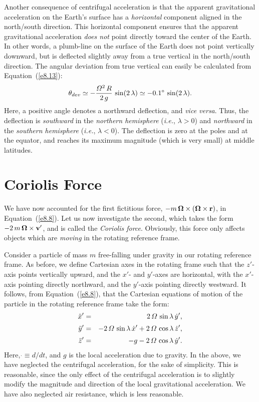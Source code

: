 Another consequence of centrifugal acceleration is that the apparent
gravitational acceleration on the Earth's surface has a {\em horizontal}\/
component aligned in the north/south direction. This horizontal component
ensures that the apparent gravitational acceleration {\em does not}\/ point
directly toward the center of the Earth. In other words,
a plumb-line on the surface of the Earth does not point vertically
downward, but is deflected slightly away from a true vertical in the north/south
direction. The angular deviation from true vertical can easily be 
calculated from Equation~(\ref{e8.13}):
\begin{equation}
\theta_{dev} \simeq - \frac{{\mit\Omega}^2\,R}{2\,g}\,\sin(2\,\lambda)\simeq 
-0.1^\circ\,\sin(2\,\lambda).
\end{equation}
Here, a positive angle denotes a northward deflection, and {\em vice versa}.
Thus, the deflection is {\em southward}\/ in the {\em northern hemisphere}\/ ({\em i.e.},
$\lambda>0$) and {\em northward}\/ in the {\em  southern hemisphere}\/ ({\em i.e.}, 
$\lambda < 0$). The deflection is
zero at the poles and at the equator, and reaches its maximum magnitude
(which is very small) at middle latitudes.

\section{Coriolis Force}
We have now accounted for the first fictitious force,
$-m\,\mbox{\boldmath$\Omega$}\times(\mbox{\boldmath$\Omega$}\times{\bf r})$, in Equation~(\ref{e8.8}).
Let us now investigate the second, which takes the form $-2\,m\,\mbox{\boldmath$\Omega$}\times{\bf v}'$, and is called the {\em Coriolis force}.
Obviously, this force only affects objects which are {\em moving}\/ in the rotating
reference frame.

Consider a particle of mass $m$ free-falling under gravity in our rotating reference frame. As before, we define  Cartesian axes in the rotating  frame such that the $z'$-axis
points vertically upward, and the $x'$- and $y'$-axes are horizontal, with
the $x'$-axis pointing directly northward, and the $y'$-axis pointing directly
westward. It follows, from Equation~(\ref{e8.8}), that the Cartesian equations of motion of the particle
in the rotating reference frame take the form:
\begin{eqnarray}\label{e8.18}
\ddot{x}' &=&2\,{\mit\Omega}\,\sin\lambda\,\dot{y}',\\[0.5ex]
\ddot{y}'&=&-2\,{\mit\Omega}\,\sin\lambda\,\dot{x}'+2\,{\mit\Omega}\,\cos\lambda\,
\dot{z}',\label{e8.19}\\[0.5ex]
\ddot{z}'&=& -g - 2\,{\mit\Omega}\,\cos\lambda\,\dot{y}'.\label{e8.20}
\end{eqnarray}
Here, $\dot{}\equiv d/dt$, and $g$ is the local acceleration due to gravity. In the
above, we have neglected the centrifugal acceleration, for the sake
of simplicity. This is reasonable, since the only effect of the centrifugal
acceleration is to slightly modify the magnitude and direction of the
local  gravitational acceleration. We have also neglected air resistance,
which is less reasonable.

